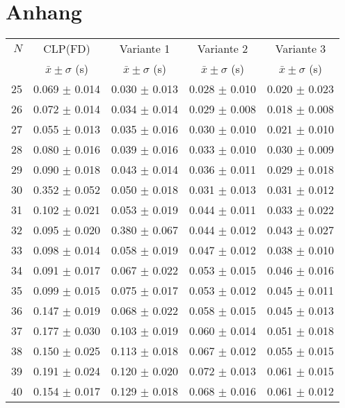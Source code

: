 \documentclass[12pt,a4paper]{article}
\begin{document}
\section{Anhang}
\begin{table}[H]
\centering
\small
\setlength{\tabcolsep}{6pt}
\begin{tabular}{rcccc}
\toprule
$N$ & CLP(FD) & Variante 1 & Variante 2 & Variante 3 \\
 & $\bar{x} \pm \sigma$ (s) & $\bar{x} \pm \sigma$ (s) & $\bar{x} \pm \sigma$ (s) & $\bar{x} \pm \sigma$ (s)\\
\midrule
25 & 0.069 $\pm$ 0.014 & 0.030 $\pm$ 0.013 & 0.028 $\pm$ 0.010 & 0.020 $\pm$ 0.023 \\
26 & 0.072 $\pm$ 0.014 & 0.034 $\pm$ 0.014 & 0.029 $\pm$ 0.008 & 0.018 $\pm$ 0.008 \\
27 & 0.055 $\pm$ 0.013 & 0.035 $\pm$ 0.016 & 0.030 $\pm$ 0.010 & 0.021 $\pm$ 0.010 \\
28 & 0.080 $\pm$ 0.016 & 0.039 $\pm$ 0.016 & 0.033 $\pm$ 0.010 & 0.030 $\pm$ 0.009 \\
29 & 0.090 $\pm$ 0.018 & 0.043 $\pm$ 0.014 & 0.036 $\pm$ 0.011 & 0.029 $\pm$ 0.018 \\
30 & 0.352 $\pm$ 0.052 & 0.050 $\pm$ 0.018 & 0.031 $\pm$ 0.013 & 0.031 $\pm$ 0.012 \\
31 & 0.102 $\pm$ 0.021 & 0.053 $\pm$ 0.019 & 0.044 $\pm$ 0.011 & 0.033 $\pm$ 0.022 \\
32 & 0.095 $\pm$ 0.020 & 0.380 $\pm$ 0.067 & 0.044 $\pm$ 0.012 & 0.043 $\pm$ 0.027 \\
33 & 0.098 $\pm$ 0.014 & 0.058 $\pm$ 0.019 & 0.047 $\pm$ 0.012 & 0.038 $\pm$ 0.010 \\
34 & 0.091 $\pm$ 0.017 & 0.067 $\pm$ 0.022 & 0.053 $\pm$ 0.015 & 0.046 $\pm$ 0.016 \\
35 & 0.099 $\pm$ 0.015 & 0.075 $\pm$ 0.017 & 0.053 $\pm$ 0.012 & 0.045 $\pm$ 0.011 \\
36 & 0.147 $\pm$ 0.019 & 0.068 $\pm$ 0.022 & 0.058 $\pm$ 0.015 & 0.045 $\pm$ 0.013 \\
37 & 0.177 $\pm$ 0.030 & 0.103 $\pm$ 0.019 & 0.060 $\pm$ 0.014 & 0.051 $\pm$ 0.018 \\
38 & 0.150 $\pm$ 0.025 & 0.113 $\pm$ 0.018 & 0.067 $\pm$ 0.012 & 0.055 $\pm$ 0.015 \\
39 & 0.191 $\pm$ 0.024 & 0.120 $\pm$ 0.020 & 0.072 $\pm$ 0.013 & 0.061 $\pm$ 0.015 \\
40 & 0.154 $\pm$ 0.017 & 0.129 $\pm$ 0.018 & 0.068 $\pm$ 0.016 & 0.061 $\pm$ 0.012 \\

\end{tabular}
\end{table}
\end{document}

